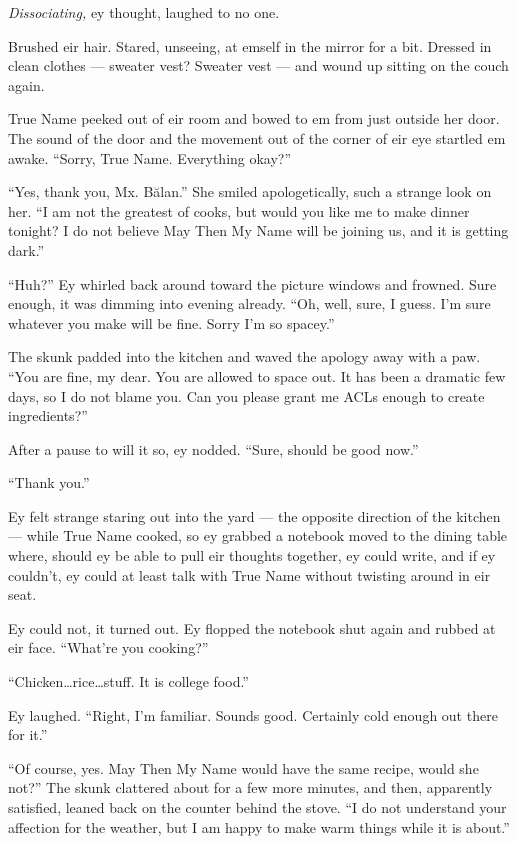 \emph{Dissociating,} ey thought, laughed to no one.

Brushed eir hair. Stared, unseeing, at emself in the mirror for a bit. Dressed in clean clothes — sweater vest? Sweater vest — and wound up sitting on the couch again.

True Name peeked out of eir room and bowed to em from just outside her door. The sound of the door and the movement out of the corner of eir eye startled em awake. ``Sorry, True Name. Everything okay?''

``Yes, thank you, Mx. Bălan.'' She smiled apologetically, such a strange look on her. ``I am not the greatest of cooks, but would you like me to make dinner tonight? I do not believe May Then My Name will be joining us, and it is getting dark.''

``Huh?'' Ey whirled back around toward the picture windows and frowned. Sure enough, it was dimming into evening already. ``Oh, well, sure, I guess. I'm sure whatever you make will be fine. Sorry I'm so spacey.''

The skunk padded into the kitchen and waved the apology away with a paw. ``You are fine, my dear. You are allowed to space out. It has been a dramatic few days, so I do not blame you. Can you please grant me ACLs enough to create ingredients?''

After a pause to will it so, ey nodded. ``Sure, should be good now.''

``Thank you.''

Ey felt strange staring out into the yard — the opposite direction of the kitchen — while True Name cooked, so ey grabbed a notebook moved to the dining table where, should ey be able to pull eir thoughts together, ey could write, and if ey couldn't, ey could at least talk with True Name without twisting around in eir seat.

Ey could not, it turned out. Ey flopped the notebook shut again and rubbed at eir face. ``What're you cooking?''

``Chicken\ldots rice\ldots stuff. It is college food.''

Ey laughed. ``Right, I'm familiar. Sounds good. Certainly cold enough out there for it.''

``Of course, yes. May Then My Name would have the same recipe, would she not?'' The skunk clattered about for a few more minutes, and then, apparently satisfied, leaned back on the counter behind the stove. ``I do not understand your affection for the weather, but I am happy to make warm things while it is about.''

